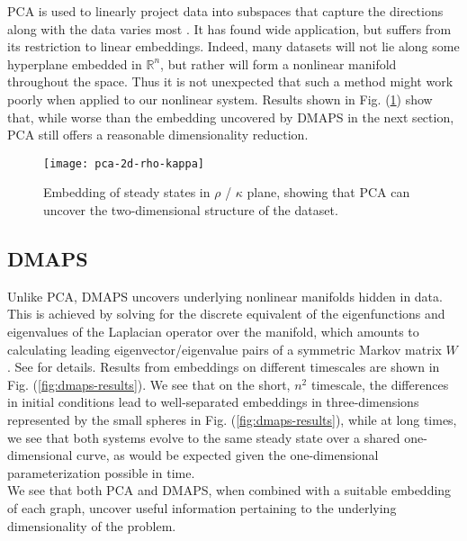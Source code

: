\documentclass[12pt]{article}
\begin{document}
\begin{onehalfspace}
PCA is used to linearly project data into subspaces that capture the
directions along with the data varies most
\cite{jolliffe_principal_2014}. It has found wide application, but
suffers from its restriction to linear embeddings. Indeed, many
datasets will not lie along some hyperplane embedded in
$\mathbb{R}^n$, but rather will form a nonlinear manifold throughout
the space. Thus it is not unexpected that such a method might work
poorly when applied to our nonlinear system. Results shown in
Fig. (\ref{fig:pca}) show that, while worse than the embedding
uncovered by DMAPS in the next section, PCA still offers a reasonable
dimensionality reduction.

\begin{figure}[ht!]
  \centering
  \texttt{[image: pca-2d-rho-kappa]}
  \caption{Embedding of steady states in $\rho$ / $\kappa$ plane,
    showing that PCA can uncover the two-dimensional structure of the
    dataset. \label{fig:pca}}
\end{figure}


\subsection{DMAPS}

Unlike PCA, DMAPS uncovers underlying nonlinear manifolds hidden in data. This is achieved by solving for the discrete equivalent of the eigenfunctions and eigenvalues of the Laplacian operator over the manifold, which amounts to calculating leading eigenvector/eigenvalue pairs of a symmetric Markov matrix $W$. See \cite{coifman_diffusion_2006, nadler_diffusion_2006} for details. Results from embeddings on different timescales are shown in Fig. (\ref{fig:dmaps-results}). We see that on the short, $n^2$ timescale, the differences in initial conditions lead to well-separated embeddings in three-dimensions represented by the small spheres in Fig. (\ref{fig:dmaps-results}), while at long times, we see that both systems evolve to the same steady state over a shared one-dimensional curve, as would be expected given the one-dimensional parameterization possible in time. \\

We see that both PCA and DMAPS, when combined with a suitable embedding of each graph, uncover useful information pertaining to the underlying dimensionality of the problem.



\end{onehalfspace}
\end{document}
